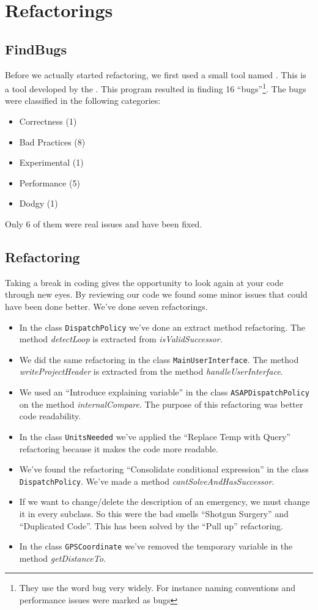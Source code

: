 \section{Refactorings}
\subsection{FindBugs}
Before we actually started refactoring, we first used a small tool named . This is a tool developed by the . This program resulted in finding 16 ``bugs''\footnote{They use the word bug very widely. For instance naming conventions and performance issues were marked as bugs}. The bugs were classified in the following categories:
\begin{itemize}
 \item Correctness (1)
 \item Bad Practices (8)
 \item Experimental (1)
 \item Performance (5)
 \item Dodgy (1)
\end{itemize}
Only 6 of them were real issues and have been fixed.
\subsection{Refactoring}
Taking a break in coding gives the opportunity to look again at your code through new eyes. By reviewing our code we found some minor issues that could have been done better. We've done seven refactorings.
\begin{itemize}
	\item In the class \texttt{DispatchPolicy} we've done an extract method refactoring. The method \textit{detectLoop} is extracted from \textit{isValidSuccessor}.
	\item We did the same refactoring in the class \texttt{MainUserInterface}. The method \textit{writeProjectHeader} is extracted from the method \textit{handleUserInterface}.
	\item We used an ``Introduce explaining variable'' in the class \texttt{ASAPDispatchPolicy} on the method \textit{internalCompare}. The purpose of this refactoring was better code readability.
	\item In the class \texttt{UnitsNeeded} we've applied the ``Replace Temp with Query'' refactoring because it makes the code more readable.
	\item We've found the refactoring ``Consolidate conditional expression'' in the class \texttt{DispatchPolicy}. We've made a method \textit{cantSolveAndHasSuccessor}.
	\item If we want to change/delete the description of an emergency, we must change it in every subclass. So this were the bad smells ``Shotgun Surgery'' and ``Duplicated Code''. This has been solved by the ``Pull up'' refactoring.
	\item In the class \texttt{GPSCoordinate} we've removed the temporary variable in the method \textit{getDistanceTo}.
\end{itemize}
